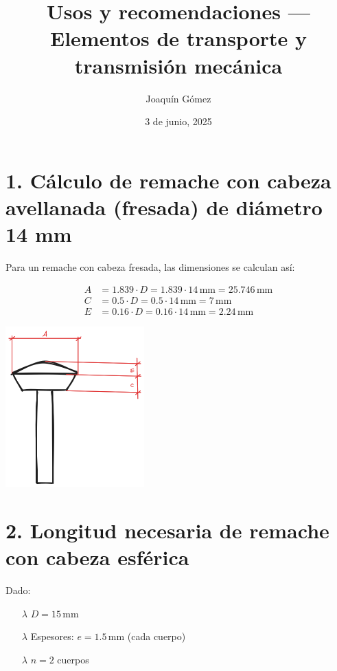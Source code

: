 \documentclass[a4paper,12pt]{article}
\title{Usos y recomendaciones --- Elementos de transporte y transmisión mecánica}
\author{Joaquín Gómez}
\date{3 de junio, 2025}
\begin{document}
\maketitle

\section*{1. Cálculo de remache con cabeza avellanada (fresada) de diámetro 14 mm}

Para un remache con cabeza fresada, las dimensiones se calculan así:

\[
\begin{aligned}
A &= 1.839 \cdot D = 1.839 \cdot 14\,\text{mm} = 25.746\,\text{mm} \\
C &= 0.5 \cdot D = 0.5 \cdot 14\,\text{mm} = 7\,\text{mm} \\
E &= 0.16 \cdot D = 0.16 \cdot 14\,\text{mm} = 2.24\,\text{mm}
\end{aligned}
\]

\vspace{0.5cm}
\begin{center}
\includegraphics[width=0.4\textwidth]{rosca.png} %
\end{center}

\section*{2. Longitud necesaria de remache con cabeza esférica}

Dado:

\begin{itemize}
\item[$\lambda$] $D = 15\,\text{mm}$
\item[$\lambda$] Espesores: $e = 1.5\,\text{mm}$ (cada cuerpo)
\item[$\lambda$] $n = 2$ cuerpos
\end{itemize}
\end{document}
